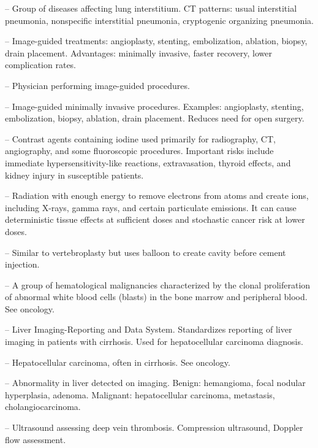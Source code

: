 -- Group of diseases affecting lung interstitium. CT patterns: usual interstitial pneumonia, nonspecific interstitial pneumonia, cryptogenic organizing pneumonia.

-- Image-guided treatments: angioplasty, stenting, embolization, ablation, biopsy, drain placement. Advantages: minimally invasive, faster recovery, lower complication rates.

-- Physician performing image-guided procedures.


-- Image-guided minimally invasive procedures. Examples: angioplasty, stenting, embolization, biopsy, ablation, drain placement. Reduces need for open surgery.

-- Contrast agents containing iodine used primarily for radiography, CT, angiography, and some fluoroscopic procedures. Important risks include immediate hypersensitivity-like reactions, extravasation, thyroid effects, and kidney injury in susceptible patients.

-- Radiation with enough energy to remove electrons from atoms and create ions, including X-rays, gamma rays, and certain particulate emissions. It can cause deterministic tissue effects at sufficient doses and stochastic cancer risk at lower doses.

-- Similar to vertebroplasty but uses balloon to create cavity before cement injection.

-- A group of hematological malignancies characterized by the clonal proliferation of abnormal white blood cells (blasts) in the bone marrow and peripheral blood. See oncology.

-- Liver Imaging-Reporting and Data System. Standardizes reporting of liver imaging in patients with cirrhosis. Used for hepatocellular carcinoma diagnosis.

-- Hepatocellular carcinoma, often in cirrhosis. See oncology.

-- Abnormality in liver detected on imaging. Benign: hemangioma, focal nodular hyperplasia, adenoma. Malignant: hepatocellular carcinoma, metastasis, cholangiocarcinoma.

-- Ultrasound assessing deep vein thrombosis. Compression ultrasound, Doppler flow assessment.

